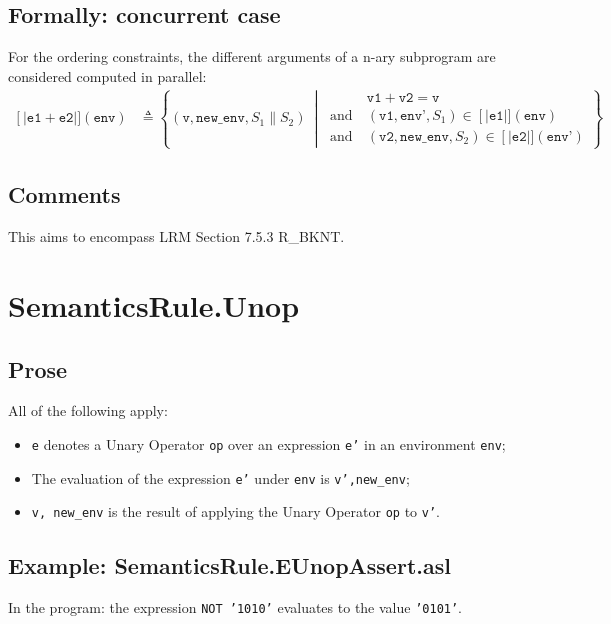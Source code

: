 \documentclass{book}
\newcommand\llbracket{[|}
\newcommand\rrbracket{|]}
\newcommand\interp[1]{\left\llbracket #1 \right\rrbracket}
\newcommand\st[0]{\ \middle|\ }
\begin{document}
  \subsection{Formally: concurrent case}
  For the ordering constraints, the different arguments of a n-ary subprogram
are considered computed in parallel:
  \begin{align}
    \interp{\texttt{e1} + \texttt{e2}} (\texttt{env}) & \triangleq
    \left\{ (\texttt{v}, \texttt{new\_env}, S_1 \parallel S_2) \st{}
    \begin{aligned}
      & \texttt{v1} + \texttt{v2} = \texttt{v}
      \\ \text{and}\ &
      (\texttt{v1}, \texttt{env'}, S_1) \in{} \interp{\texttt{e1}} (\texttt{env})
      \\ \text{and}\ &
      (\texttt{v2}, \texttt{new\_env}, S_2) \in{} \interp{\texttt{e2}} (\texttt{env'})
    \end{aligned}
    \right\}
  \label{eq:sem-conc-plus}
  \end{align} 

  \subsection{Comments}
  This aims to encompass LRM Section 7.5.3 R\_BKNT.

\section{SemanticsRule.Unop \label{sec:SemanticsRule.Unop}}

  \subsection{Prose}
  All of the following apply:
  \begin{itemize}
  \item \texttt{e} denotes a Unary Operator \texttt{op} over an expression \texttt{e'} in an environment \texttt{env};
  \item The evaluation of the expression \texttt{e'} under \texttt{env} is \texttt{v',new\_env};
  \item \texttt{v, new\_env} is the result of applying the Unary Operator \texttt{op} to \texttt{v'}.
  \end{itemize}

  \subsection{Example: SemanticsRule.EUnopAssert.asl}
    In the program:
    the expression \texttt{NOT '1010'} evaluates to the value \texttt{'0101'}.
\end{document}
